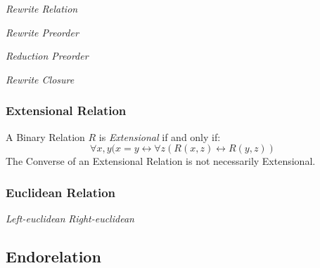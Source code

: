 \emph{Rewrite Relation}

\emph{Rewrite Preorder}

\emph{Reduction Preorder}

\emph{Rewrite Closure}



\subsubsection{Extensional Relation}\label{sec:extensional_relation}

A Binary Relation $R$ is \emph{Extensional} if and only if:
\[
  \forall x,y (x = y \leftrightarrow
    \forall z (R(x,z) \leftrightarrow R(y,z))
\]
The Converse of an Extensional Relation is not necessarily
Extensional.

\subsubsection{Euclidean Relation}\label{sec:euclidean_relation}

\emph{Left-euclidean} \emph{Right-euclidean}



\subsection{Endorelation}\label{sec:endorelation}

